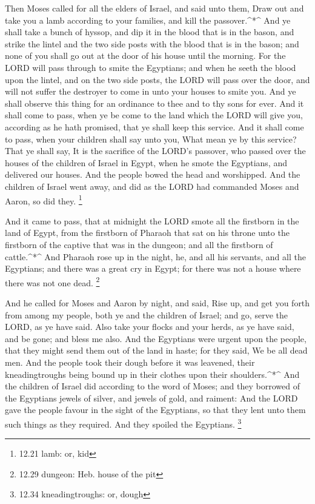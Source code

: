  Then Moses called for all the elders of Israel, and said
unto them, Draw out and take you a lamb according to your families, and
kill the passover.\^{}*\^{}  And ye shall take a bunch of
hyssop, and dip it in the blood that is in the bason, and strike the
lintel and the two side posts with the blood that is in the bason; and
none of you shall go out at the door of his house until the morning.
 For the LORD will pass through to smite the Egyptians; and
when he seeth the blood upon the lintel, and on the two side posts, the
LORD will pass over the door, and will not suffer the destroyer to come
in unto your houses to smite you.  And ye shall observe
this thing for an ordinance to thee and to thy sons for ever.
 And it shall come to pass, when ye be come to the land
which the LORD will give you, according as he hath promised, that ye
shall keep this service.  And it shall come to pass, when
your children shall say unto you, What mean ye by this service?
 That ye shall say, It is the sacrifice of the LORD's
passover, who passed over the houses of the children of Israel in Egypt,
when he smote the Egyptians, and delivered our houses. And the people
bowed the head and worshipped.  And the children of Israel
went away, and did as the LORD had commanded Moses and Aaron, so did
they. \footnote{12.21 lamb: or, kid}

 And it came to pass, that at midnight the LORD smote all
the firstborn in the land of Egypt, from the firstborn of Pharaoh that
sat on his throne unto the firstborn of the captive that was in the
dungeon; and all the firstborn of cattle.\^{}*\^{}  And
Pharaoh rose up in the night, he, and all his servants, and all the
Egyptians; and there was a great cry in Egypt; for there was not a house
where there was not one dead. \footnote{12.29 dungeon: Heb. house of the
  pit}

 And he called for Moses and Aaron by night, and said, Rise
up, and get you forth from among my people, both ye and the children of
Israel; and go, serve the LORD, as ye have said.  Also take
your flocks and your herds, as ye have said, and be gone; and bless me
also.  And the Egyptians were urgent upon the people, that
they might send them out of the land in haste; for they said, We be all
dead men.  And the people took their dough before it was
leavened, their kneadingtroughs being bound up in their clothes upon
their shoulders.\^{}*\^{}  And the children of Israel did
according to the word of Moses; and they borrowed of the Egyptians
jewels of silver, and jewels of gold, and raiment:  And the
LORD gave the people favour in the sight of the Egyptians, so that they
lent unto them such things as they required. And they spoiled the
Egyptians. \footnote{12.34 kneadingtroughs: or, dough}

